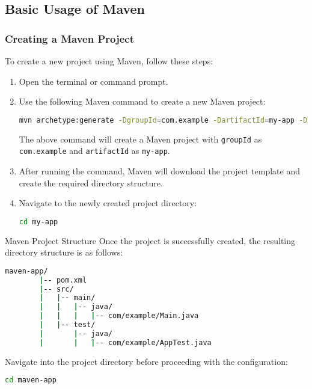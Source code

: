 \documentclass[aspectratio=169, table]{beamer}
\begin{document}
\subsection{Basic Usage of Maven}
\begin{frame}[fragile]
	\vspace{20pt}
	\frametitle{Creating a Maven Project}
	To create a new project using Maven, follow these steps:
	\begin{enumerate}
		\item Open the terminal or command prompt.
		\item Use the following Maven command to create a new Maven project:
		\begin{lstlisting}[language=bash]
			mvn archetype:generate -DgroupId=com.example -DartifactId=my-app -DarchetypeArtifactId=maven-archetype-quickstart -DinteractiveMode=false
		\end{lstlisting}
		The above command will create a Maven project with \texttt{groupId} as \texttt{com.example} and \texttt{artifactId} as \texttt{my-app}.
		\item After running the command, Maven will download the project template and create the required directory structure.
		\item Navigate to the newly created project directory:
		\begin{lstlisting}[language=bash]
			cd my-app
		\end{lstlisting}
	\end{enumerate}
\end{frame}

\begin{frame}[fragile]{Maven Project Structure}
	Once the project is successfully created, the resulting directory structure is as follows:
	\begin{lstlisting}[language=bash]
		maven-app/
		|-- pom.xml
		|-- src/
		|   |-- main/
		|   |   |-- java/
		|   |   |   |-- com/example/Main.java
		|   |-- test/
		|       |-- java/
		|       |   |-- com/example/AppTest.java
	\end{lstlisting}
	
	Navigate into the project directory before proceeding with the configuration:
	\begin{lstlisting}[language=bash]
		cd maven-app
	\end{lstlisting}
\end{frame}
\end{document}
